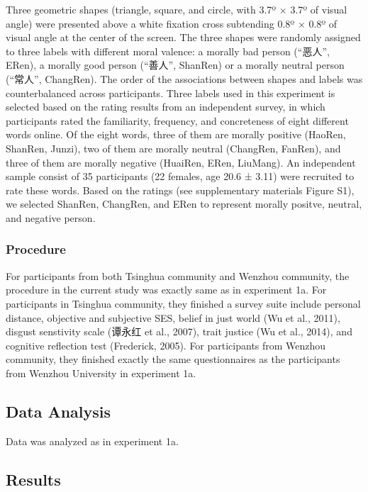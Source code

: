 \documentclass[man]{apa6}
\begin{document}
Three geometric shapes (triangle, square, and circle, with 3.7º × 3.7º of visual angle) were presented above a white fixation cross subtending 0.8º × 0.8º of visual angle at the center of the screen. The three shapes were randomly assigned to three labels with different moral valence: a morally bad person (\enquote{恶人}, ERen), a morally good person (\enquote{善人}, ShanRen) or a morally neutral person (\enquote{常人}, ChangRen). The order of the associations between shapes and labels was counterbalanced across participants.
Three labels used in this experiment is selected based on the rating results from an independent survey, in which participants rated the familiarity, frequency, and concreteness of eight different words online. Of the eight words, three of them are morally positive (HaoRen, ShanRen, Junzi), two of them are morally neutral (ChangRen, FanRen), and three of them are morally negative (HuaiRen, ERen, LiuMang). An independent sample consist of 35 participants (22 females, age 20.6 ± 3.11) were recruited to rate these words. Based on the ratings (see supplementary materials Figure S1), we selected ShanRen, ChangRen, and ERen to represent morally positve, neutral, and negative person.

\hypertarget{procedure-1}{%
\subsubsection{Procedure}\label{procedure-1}}

For participants from both Tsinghua community and Wenzhou community, the procedure in the current study was exactly same as in experiment 1a. For participants in Tsinghua community, they finished a survey suite include personal distance, objective and subjective SES, belief in just world (Wu et al., 2011), disgust senstivity scale (谭永红 et al., 2007), trait justice (Wu et al., 2014), and cognitive reflection test (Frederick, 2005). For participants from Wenzhou community, they finished exactly the same questionnaires as the participants from Wenzhou University in experiment 1a.

\hypertarget{data-analysis-2}{%
\subsection{Data Analysis}\label{data-analysis-2}}

Data was analyzed as in experiment 1a.

\hypertarget{results-1}{%
\subsection{Results}\label{results-1}}
\end{document}
